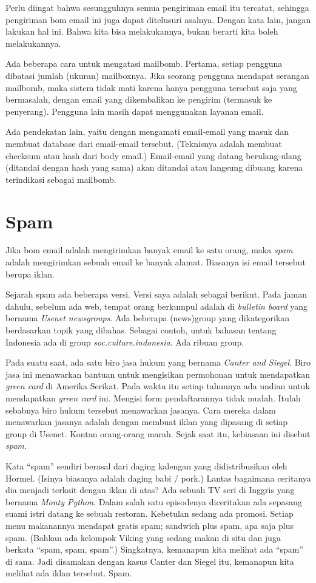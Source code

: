 Perlu diingat bahwa sesungguhnya semua pengiriman email itu tercatat, sehingga
pengiriman bom email ini juga dapat ditelusuri asalnya. Dengan kata lain,
jangan lakukan hal ini. Bahwa kita bisa melakukannya, bukan berarti kita boleh
melakukannya.

Ada beberapa cara untuk mengatasi mailbomb. Pertama, setiap pengguna dibatasi
jumlah (ukuran) mailboxnya. Jika seorang pengguna mendapat serangan mailbomb,
maka sistem tidak mati karena hanya pengguna tersebut saja yang bermasalah,
dengan email yang dikembalikan ke pengirim (termasuk ke penyerang).
Pengguna lain masih dapat menggunakan layanan email.

Ada pendekatan lain, yaitu dengan mengamati email-email yang masuk dan membuat
database dari email-email tersebut. (Teknisnya adalah membuat checksum atau
hash dari body email.) Email-email yang datang berulang-ulang (ditandai dengan
hash yang sama) akan ditandai atau langsung dibuang karena terindikasi sebagai
mailbomb.

\section{Spam}
Jika bom email adalah mengirimkan banyak email ke satu orang, maka {\em spam}
adalah mengirimkan sebuah email ke banyak alamat. Biasanya isi email tersebut
berupa iklan.

Sejarah spam ada beberapa versi. Versi saya adalah sebagai berikut. Pada jaman
dahulu, sebelum ada web, tempat orang berkumpul adalah di {\em bulletin board}
yang bernama {\em Usenet newsgroups}. Ada beberapa (news)group yang
dikategorikan berdasarkan topik yang dibahas. Sebagai contoh, untuk bahasan
tentang Indonesia ada di group {\em soc.culture.indonesia}. Ada ribuan group.

Pada suatu saat, ada satu biro jasa hukum yang bernama {\em Canter and Siegel}.
Biro jasa ini menawarkan bantuan untuk mengisikan permohonan untuk mendapatkan
{\em green card} di Amerika Serikat. Pada waktu itu setiap tahunnya ada undian
untuk mendapatkan {\em green card} ini. Mengisi form pendaftarannya tidak
mudah. Itulah sebabnya biro hukum tersebut menawarkan jasanya. Cara mereka
dalam menawarkan jasanya adalah dengan membuat iklan yang dipasang di setiap
group di Usenet. Kontan orang-orang marah. Sejak saat itu, kebiasaan ini
disebut {\em spam}.

Kata ``spam'' sendiri berasal dari daging kalengan yang didistribusikan oleh
Hormel. (Isinya biasanya adalah daging babi / pork.) Lantas bagaimana ceritanya
dia menjadi terkait dengan iklan di atas? Ada sebuah TV seri di Inggris yang
bernama {\em Monty Python}. Dalam salah satu episodenya diceritakan ada
sepasang suami istri datang ke sebuah restoran. Kebetulan sedang ada promosi.
Setiap menu makanannya mendapat gratis spam; sandwich plus spam, apa saja plus
spam. (Bahkan ada kelompok Viking yang sedang makan di situ dan juga berkata
``spam, spam, spam''.) Singkatnya, kemanapun kita melihat ada ``spam'' di sana.
Jadi disamakan dengan kasus Canter dan Siegel itu, kemanapun kita melihat ada
iklan tersebut. Spam.

